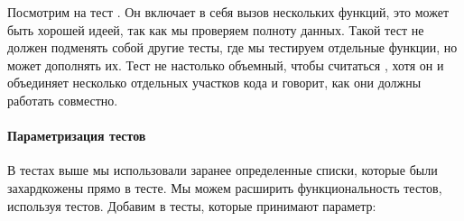 \documentclass[letterpaper,10pt,russian]{sphinxmanual}
\begin{document}
\begin{sphinxVerbatim}[commandchars=\\\{\}]
 
                              

 

   

 
     
           \PYG{p}{[}    \PYG{p}{]}

     
               
\end{sphinxVerbatim}

\sphinxAtStartPar
Посмотрим на тест . Он включает в себя вызов нескольких функций, это может быть хорошей идеей, так как мы проверяем полноту данных. Такой тест не должен подменять собой другие тесты, где мы тестируем отдельные функции, но может дополнять их. Тест не настолько объемный, чтобы считаться , хотя он и объединяет несколько отдельных участков кода и говорит, как они должны работать совместно.


\paragraph{Параметризация тестов}
\label{\detokenize{educational_materials/testing/content:id6}}
\sphinxAtStartPar
В тестах выше мы использовали заранее определенные списки, которые были захардкожены прямо в тесте. Мы можем расширить функциональность тестов, используя  тестов. Добавим в  тесты, которые принимают параметр:
\end{document}
